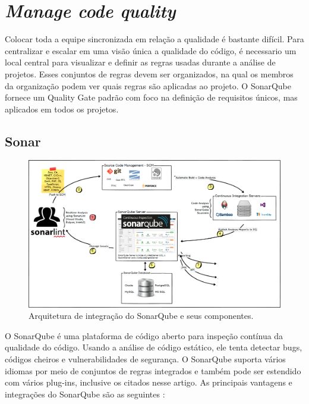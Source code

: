 \documentclass[12pt]{article}
\begin{document}
\section{\textit{Manage code quality}} \label{sec:managecodequality}

Colocar toda a equipe sincronizada em relação a qualidade é bastante difícil. Para centralizar e escalar em uma visão única a qualidade do código, é necessario um local central para visualizar e definir as regras usadas durante a análise de projetos. Esses conjuntos de regras devem ser organizados, na qual os membros da organização podem ver quais regras são aplicadas ao projeto.
O SonarQube\cite{SONARQUBE} fornece um Quality Gate padrão com foco na definição de requisitos únicos, mas aplicados em todos os projetos.

\subsection{Sonar} \label{sec:sonar}

\begin{figure}[h]
	\centering
		\includegraphics[scale=0.25]{img/img-sonar.png}
	\caption{Arquitetura\cite{SONARQUBE} de integração do SonarQube e seus componentes.}
	\label{fig:sonar-arquitetura}
\end{figure}

O SonarQube\cite{SONAR} é uma plataforma de código aberto para inspeção contínua da qualidade do código. Usando a análise de código estático, ele tenta detectar bugs, códigos cheiros e vulnerabilidades de segurança. O SonarQube suporta vários idiomas por meio de conjuntos de regras integrados e também pode ser estendido com vários plug-ins, inclusive os citados nesse artigo.
As principais vantagens e integrações do SonarQube são as seguintes \cite{SONARQUBE_IN_ACTION}:
\end{document}
